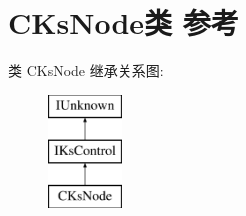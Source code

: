\hypertarget{class_c_ks_node}{}\section{C\+Ks\+Node类 参考}
\label{class_c_ks_node}
类 C\+Ks\+Node 继承关系图\+:\begin{figure}[H]
\begin{center}
\leavevmode
\includegraphics[height=3.000000cm]{class_c_ks_node}
\end{center}
\end{figure}
